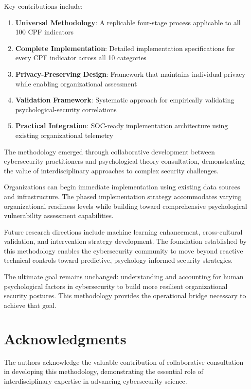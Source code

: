 \documentclass[11pt, onecolumn]{article}
\begin{document}
Key contributions include:

\begin{enumerate}
\item \textbf{Universal Methodology}: A replicable four-stage process applicable to all 100 CPF indicators
\item \textbf{Complete Implementation}: Detailed implementation specifications for every CPF indicator across all 10 categories
\item \textbf{Privacy-Preserving Design}: Framework that maintains individual privacy while enabling organizational assessment
\item \textbf{Validation Framework}: Systematic approach for empirically validating psychological-security correlations
\item \textbf{Practical Integration}: SOC-ready implementation architecture using existing organizational telemetry
\end{enumerate}

The methodology emerged through collaborative development between cybersecurity practitioners and psychological theory consultation, demonstrating the value of interdisciplinary approaches to complex security challenges.

Organizations can begin immediate implementation using existing data sources and infrastructure. The phased implementation strategy accommodates varying organizational readiness levels while building toward comprehensive psychological vulnerability assessment capabilities.

Future research directions include machine learning enhancement, cross-cultural validation, and intervention strategy development. The foundation established by this methodology enables the cybersecurity community to move beyond reactive technical controls toward predictive, psychology-informed security strategies.

The ultimate goal remains unchanged: understanding and accounting for human psychological factors in cybersecurity to build more resilient organizational security postures. This methodology provides the operational bridge necessary to achieve that goal.

\section*{Acknowledgments}

The authors acknowledge the valuable contribution of collaborative consultation in developing this methodology, demonstrating the essential role of interdisciplinary expertise in advancing cybersecurity science.
\end{document}
